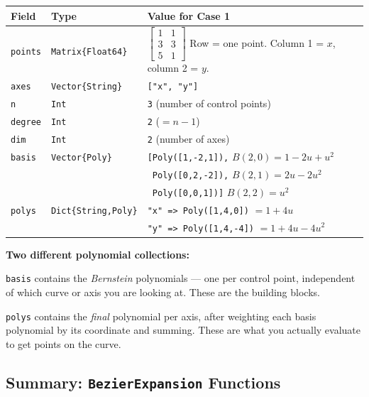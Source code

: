 \documentclass[12pt, a4paper]{article}
\newcommand{\cd}[1]{\texttt{#1}}
\begin{document}
\medskip
\begin{center}
\begin{tabular}{llp{7.5cm}}
\toprule
Field & Type & Value for Case 1 \\
\midrule
\cd{points} & \cd{Matrix\{Float64\}} &
  $\begin{bmatrix}1 & 1 \\ 3 & 3 \\ 5 & 1\end{bmatrix}$
  Row = one point. Column 1 = $x$, column 2 = $y$. \\[10pt]
\cd{axes} & \cd{Vector\{String\}} &
  \cd{["x", "y"]} \\[4pt]
\cd{n} & \cd{Int} &
  \cd{3} (number of control points) \\[4pt]
\cd{degree} & \cd{Int} &
  \cd{2} ($= n - 1$) \\[4pt]
\cd{dim} & \cd{Int} &
  \cd{2} (number of axes) \\[4pt]
\cd{basis} & \cd{Vector\{Poly\}} &
  \cd{[Poly([1,-2,1]),} $B(2,0)=1-2u+u^2$ \\
  & & \cd{\ Poly([0,2,-2]),} $B(2,1)=2u-2u^2$ \\
  & & \cd{\ Poly([0,0,1])]} $B(2,2)=u^2$ \\[4pt]
\cd{polys} & \cd{Dict\{String,Poly\}} &
  \cd{"x" => Poly([1,4,0])} $= 1+4u$ \\
  & & \cd{"y" => Poly([1,4,-4])} $= 1+4u-4u^2$ \\
\bottomrule
\end{tabular}
\end{center}

\begin{notebox}
\textbf{Two different polynomial collections:}

\cd{basis} contains the \emph{Bernstein} polynomials --- one per
control point, independent of which curve or axis you are looking at.
These are the building blocks.

\cd{polys} contains the \emph{final} polynomial per axis,
after weighting each basis polynomial by its coordinate and summing.
These are what you actually evaluate to get points on the curve.
\end{notebox}


\subsection*{Summary: \texttt{BezierExpansion} Functions}
\end{document}
